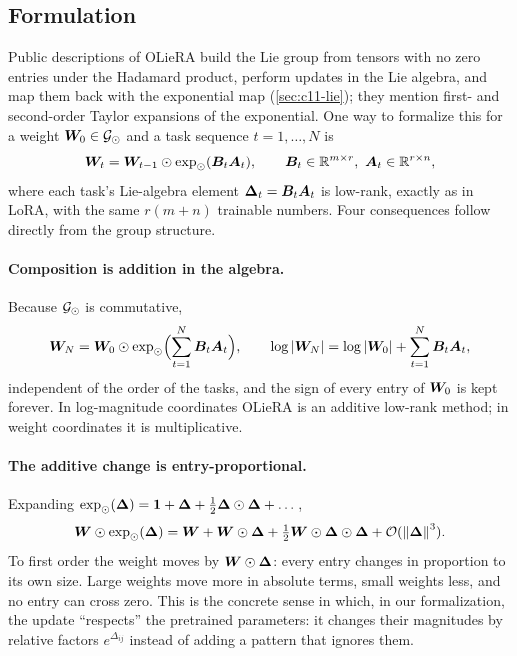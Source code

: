 \subsection{Formulation}\label{sec:c11-ol-formulation}

Public descriptions of OLieRA build the Lie group from tensors with no zero entries under the
Hadamard product, perform updates in the Lie algebra, and map them back with the exponential map
(\cref{sec:c11-lie}); they mention first- and second-order Taylor expansions of the exponential.
One way to formalize this for a weight $\bm{W}_0 \in \mathcal{G}_{\odot}$ and a task sequence
$t = 1,\dots,N$ is
\begin{equation}
  \bm{W}_t = \bm{W}_{t-1}\odot\exp_{\odot}(\bm{B}_t\bm{A}_t),
  \qquad \bm{B}_t \in \mathbb{R}^{m\times r},\ \bm{A}_t \in \mathbb{R}^{r\times n},
  \label{eq:c11-olie-update}
\end{equation}
where each task's Lie-algebra element $\bm{\Delta}_t = \bm{B}_t\bm{A}_t$ is low-rank, exactly as in LoRA,
with the same $r(m+n)$ trainable numbers. Four consequences follow directly from the group
structure.

\paragraph{Composition is addition in the algebra.} Because $\mathcal{G}_{\odot}$ is commutative,
\begin{equation}
  \bm{W}_N = \bm{W}_0\odot\exp_{\odot}\Bigl(\sum_{t=1}^N\bm{B}_t\bm{A}_t\Bigr),
  \qquad
  \log\left\lvert \bm{W}_N\right\rvert = \log\left\lvert \bm{W}_0\right\rvert + \sum_{t=1}^N\bm{B}_t\bm{A}_t ,
  \label{eq:c11-olie-compose}
\end{equation}
independent of the order of the tasks, and the sign of every entry of $\bm{W}_0$ is kept forever.
In log-magnitude coordinates OLieRA is an additive low-rank method; in weight coordinates it is
multiplicative.

\paragraph{The additive change is entry-proportional.} Expanding
$\exp_{\odot}(\bm{\Delta}) = \bm{1} + \bm{\Delta} + \tfrac12\bm{\Delta}\odot\bm{\Delta} + \dots$,
\begin{equation}
  \bm{W}\odot\exp_{\odot}(\bm{\Delta}) = \bm{W} + \bm{W}\odot\bm{\Delta} + \tfrac12\bm{W}\odot\bm{\Delta}\odot\bm{\Delta} + \mathcal{O}(\left\lVert \bm{\Delta}\right\rVert^3).
  \label{eq:c11-olie-taylor}
\end{equation}
To first order the weight moves by $\bm{W}\odot\bm{\Delta}$: every entry changes in proportion to its own
size. Large weights move more in absolute terms, small weights less, and no entry can cross
zero. This is the concrete sense in which, in our formalization, the update ``respects'' the
pretrained parameters: it changes their magnitudes by relative factors $e^{\Delta_{ij}}$ instead
of adding a pattern that ignores them.

